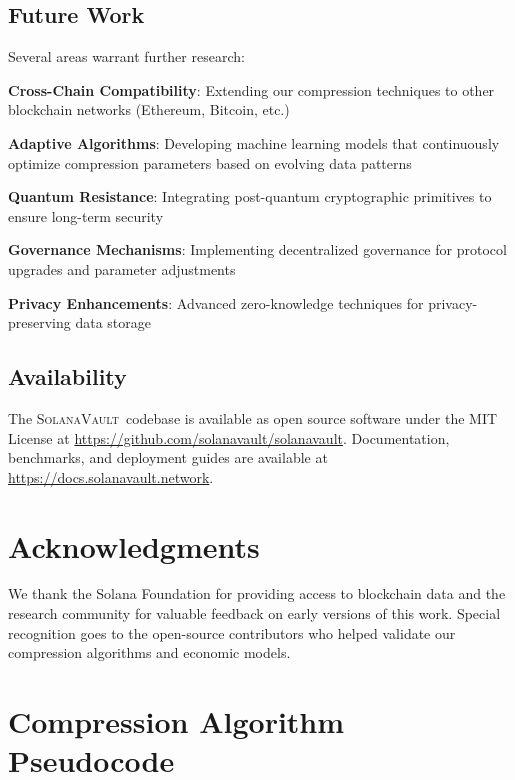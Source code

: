 \documentclass[11pt,a4paper]{article}
\newcommand{\SolanaVault}{\textsc{SolanaVault}}
\begin{document}
\subsection{Future Work}

Several areas warrant further research:

\textbf{Cross-Chain Compatibility}: Extending our compression techniques to other blockchain networks (Ethereum, Bitcoin, etc.)

\textbf{Adaptive Algorithms}: Developing machine learning models that continuously optimize compression parameters based on evolving data patterns

\textbf{Quantum Resistance}: Integrating post-quantum cryptographic primitives to ensure long-term security

\textbf{Governance Mechanisms}: Implementing decentralized governance for protocol upgrades and parameter adjustments

\textbf{Privacy Enhancements}: Advanced zero-knowledge techniques for privacy-preserving data storage

\subsection{Availability}

The \SolanaVault\ codebase is available as open source software under the MIT License at \url{https://github.com/solanavault/solanavault}. Documentation, benchmarks, and deployment guides are available at \url{https://docs.solanavault.network}.

\section*{Acknowledgments}

We thank the Solana Foundation for providing access to blockchain data and the research community for valuable feedback on early versions of this work. Special recognition goes to the open-source contributors who helped validate our compression algorithms and economic models.




\appendix

\section{Compression Algorithm Pseudocode}
\label{appendix:algorithms}
\end{document}
